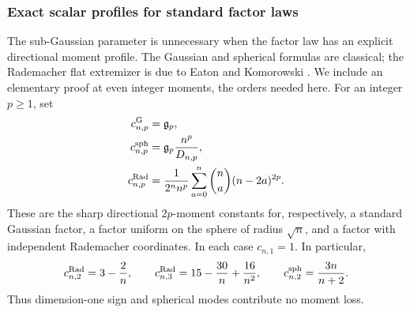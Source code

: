 \documentclass[11pt,a4paper]{article}
\theoremstyle{definition}\newtheorem{definition}[theorem]{Definition}
\theoremstyle{remark}\newtheorem{remark}[theorem]{Remark}
\numberwithin{equation}{section}
\newcommand{\gmom}{\mathfrak g}
\begin{document}
\subsubsection{Exact scalar profiles for standard factor laws}
\label{core:sec:law-profiles}

The sub-Gaussian parameter is unnecessary when the factor law has an
explicit directional moment profile.
The Gaussian and spherical formulas are classical; the Rademacher
flat extremizer is due to Eaton and Komorowski
\cite{Eaton1970,Komorowski1988}. We include an elementary proof at even
integer moments, the orders needed here. For an integer $p\ge1$, set
\begin{equation}\label{core:eq:standard-local-profiles}
 \begin{aligned}
 c^{\rm G}_{n,p}&=\gmom_p,\\
 c^{\rm sph}_{n,p}&=\gmom_p\frac{n^p}{D_{n,p}},\\
 c^{\rm Rad}_{n,p}&=\frac1{2^n n^p}
   \sum_{a=0}^n\binom na(n-2a)^{2p}.
 \end{aligned}
\end{equation}
These are the sharp directional $2p$-moment constants for, respectively,
a standard Gaussian factor, a factor uniform on the sphere of radius
$\sqrt n$, and a factor with independent Rademacher coordinates.
In each case $c_{n,1}=1$.
In particular,
\[
 c^{\rm Rad}_{n,2}=3-\frac2n,\qquad
 c^{\rm Rad}_{n,3}=15-\frac{30}n+\frac{16}{n^2},\qquad
 c^{\rm sph}_{n,2}=\frac{3n}{n+2}.
\]
Thus dimension-one sign and spherical modes contribute no moment loss.
\end{document}
